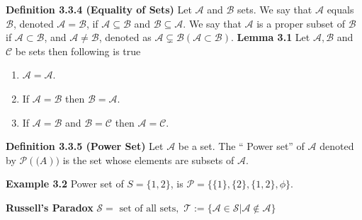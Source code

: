 \documentclass[a4paper,english,12pt]{article}
\begin{document}
\textbf{Definition 3.3.4 (Equality of Sets)} Let $\mathcal{A}$ and $\mathcal{B}$ sets. We say that $\mathcal{A}$ equals $\mathcal{B}$, denoted $\mathcal{A}=\mathcal{B}$, if $\mathcal{A}\subseteq \mathcal{B}$ and $\mathcal{B}\subseteq \mathcal{A}$. We say that $\mathcal{A}$ is a proper subset of $\mathcal{B}$ if $\mathcal{A}\subset \mathcal{B}$, and $\mathcal{A}\neq \mathcal{B}$, denoted as $\mathcal{A}\varsubsetneq \mathcal{B} (\mathcal{A}\subset \mathcal{B})$. 
\textbf{Lemma 3.1} Let $\mathcal{A},\mathcal{B}$ and $\mathcal{C}$ be sets then following is true
\begin{enumerate}
 \item $\mathcal{A}= \mathcal{A}$.
 \item If $\mathcal{A}= \mathcal{B}$ then $\mathcal{B}= \mathcal{A}$.
 \item If $\mathcal{A}= \mathcal{B}$ and $\mathcal{B}= \mathcal{C}$ then $\mathcal{A}= \mathcal{C}$.
\end{enumerate}
\textbf{Definition 3.3.5 (Power Set)} Let $\mathcal{A}$ be a set. The `` Power set'' of $\mathcal{A}$ denoted by $\mathcal{P}(\mathcal(A))$ is the set whose elements are subsets of $\mathcal{A}$.

\textbf{Example 3.2} Power set of $S=\{1,2\}$, is $\mathcal{P}=\{\{1\},\{2\},\{1,2\},\phi\}$.

\textbf{Russell's Paradox}
$\mathcal{S} = \text{ set of all sets},$ $\mathcal{T}:=\{\mathcal{A}\in\mathcal{S}|\mathcal{A}\not\in\mathcal{A} \}$
\end{document}
